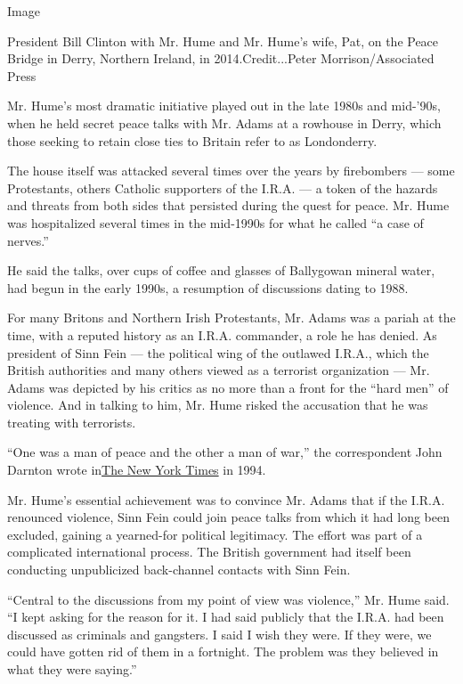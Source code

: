 Image

President Bill Clinton with Mr. Hume and Mr. Hume's wife, Pat, on the
Peace Bridge in Derry, Northern Ireland, in 2014.Credit...Peter
Morrison/Associated Press

Mr. Hume's most dramatic initiative played out in the late 1980s and
mid-'90s, when he held secret peace talks with Mr. Adams at a rowhouse
in Derry, which those seeking to retain close ties to Britain refer to
as Londonderry.

The house itself was attacked several times over the years by
firebombers --- some Protestants, others Catholic supporters of the
I.R.A. --- a token of the hazards and threats from both sides that
persisted during the quest for peace. Mr. Hume was hospitalized several
times in the mid-1990s for what he called ``a case of nerves.''

He said the talks, over cups of coffee and glasses of Ballygowan mineral
water, had begun in the early 1990s, a resumption of discussions dating
to 1988.

For many Britons and Northern Irish Protestants, Mr. Adams was a pariah
at the time, with a reputed history as an I.R.A. commander, a role he
has denied. As president of Sinn Fein --- the political wing of the
outlawed I.R.A., which the British authorities and many others viewed as
a terrorist organization --- Mr. Adams was depicted by his critics as no
more than a front for the ``hard men'' of violence. And in talking to
him, Mr. Hume risked the accusation that he was treating with
terrorists.

``One was a man of peace and the other a man of war,'' the correspondent
John Darnton wrote
in\href{http://www.nytimes3xbfgragh.onion/1994/09/05/world/turning-point-ira-cease-fire-special-report-2-irish-foes-journey-deeds-words.html?pagewanted=1}{The
New York Times} in 1994.

Mr. Hume's essential achievement was to convince Mr. Adams that if the
I.R.A. renounced violence, Sinn Fein could join peace talks from which
it had long been excluded, gaining a yearned-for political legitimacy.
The effort was part of a complicated international process. The British
government had itself been conducting unpublicized back-channel contacts
with Sinn Fein.

``Central to the discussions from my point of view was violence,'' Mr.
Hume said. ``I kept asking for the reason for it. I had said publicly
that the I.R.A. had been discussed as criminals and gangsters. I said I
wish they were. If they were, we could have gotten rid of them in a
fortnight. The problem was they believed in what they were saying.''

